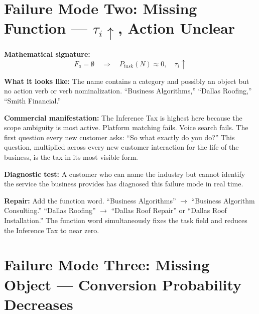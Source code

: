 \documentclass[12pt, openany]{book}
\theoremstyle{thmstyle}
\theoremstyle{defstyle}
\begin{document}
\section{Failure Mode Two: Missing Function --- $\tau_i\uparrow$, Action Unclear}

\begin{failbox}
\textbf{Mathematical signature:}
\[
F_a = \emptyset \quad \Rightarrow \quad P_{task}(N) \approx 0, \quad \tau_i \uparrow
\]

\textbf{What it looks like:} The name contains a category and possibly an object but no action verb or verb nominalization. ``Business Algorithms,'' ``Dallas Roofing,'' ``Smith Financial.''

\textbf{Commercial manifestation:} The Inference Tax is highest here because the scope ambiguity is most active. Platform matching fails. Voice search fails. The first question every new customer asks: ``So what exactly do you do?'' This question, multiplied across every new customer interaction for the life of the business, is the tax in its most visible form.

\textbf{Diagnostic test:} A customer who can name the industry but cannot identify the service the business provides has diagnosed this failure mode in real time.

\textbf{Repair:} Add the function word. ``Business Algorithms'' $\to$ ``Business Algorithm Consulting.'' ``Dallas Roofing'' $\to$ ``Dallas Roof Repair'' or ``Dallas Roof Installation.'' The function word simultaneously fixes the task field and reduces the Inference Tax to near zero.
\end{failbox}

\section{Failure Mode Three: Missing Object --- Conversion Probability Decreases}
\end{document}

